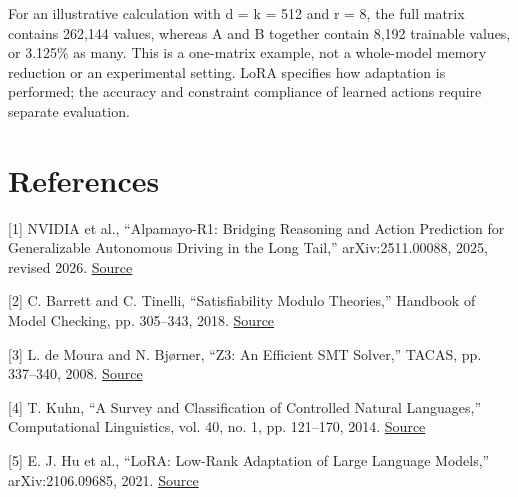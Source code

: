 \documentclass[11pt,a4paper]{article}
\begin{document}
For an illustrative calculation with d = k = 512 and r = 8, the full matrix contains 262,144 values, whereas A and B together contain 8,192 trainable values, or 3.125\% as many. This is a one-matrix example, not a whole-model memory reduction or an experimental setting. LoRA specifies how adaptation is performed; the accuracy and constraint compliance of learned actions require separate evaluation.\par

\section*{References}

[1] NVIDIA et al., “Alpamayo-R1: Bridging Reasoning and Action Prediction for Generalizable Autonomous Driving in the Long Tail,” arXiv:2511.00088, 2025, revised 2026. \href{\detokenize{https://arxiv.org/abs/2511.00088}}{Source}\par

[2] C. Barrett and C. Tinelli, “Satisfiability Modulo Theories,” Handbook of Model Checking, pp. 305–343, 2018. \href{\detokenize{https://theory.stanford.edu/~barrett/pubs/BT18.pdf}}{Source}\par

[3] L. de Moura and N. Bjørner, “Z3: An Efficient SMT Solver,” TACAS, pp. 337–340, 2008. \href{\detokenize{https://doi.org/10.1007/978-3-540-78800-3_24}}{Source}\par

[4] T. Kuhn, “A Survey and Classification of Controlled Natural Languages,” Computational Linguistics, vol. 40, no. 1, pp. 121–170, 2014. \href{\detokenize{https://aclanthology.org/J14-1005/}}{Source}\par

[5] E. J. Hu et al., “LoRA: Low-Rank Adaptation of Large Language Models,” arXiv:2106.09685, 2021. \href{\detokenize{https://arxiv.org/abs/2106.09685}}{Source}\par
\end{document}

